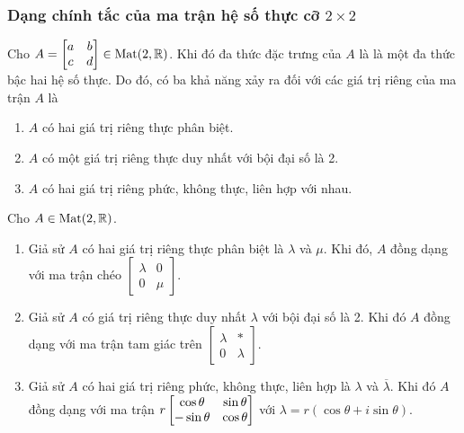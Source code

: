 \subsubsection{Dạng chính tắc của ma trận hệ số thực cỡ $2\times 2$}

Cho $A = \begin{bmatrix} a & b \\ c & d \\ \end{bmatrix} \in \operatorname{Mat}(2,\mathbb{R})$. Khi đó đa thức đặc trưng của $A$ là 
là một đa thức bậc hai hệ số thực. Do đó, có ba khả năng xảy ra đối với các giá trị riêng của ma trận $A$ là
\begin{enumerate}
    \item $A$ có hai giá trị riêng thực phân biệt.
    \item $A$ có một giá trị riêng thực duy nhất với bội đại số là 2.
    \item $A$ có hai giá trị riêng phức, không thực, liên hợp với nhau.
\end{enumerate}
\begin{prop}\label{prop 3.1.6}
Cho $A \in \operatorname{Mat}(2,\mathbb{R})$.
\begin{enumerate}
    \item Giả sử $A$ có hai giá trị riêng thực phân biệt là $\lambda$ và $\mu$.
    Khi đó, $A$ đồng dạng với ma trận chéo $\begin{bmatrix}
        \lambda & 0\\
        0 & \mu
    \end{bmatrix}$.
    \item Giả sử $A$ có giá trị riêng thực duy nhất $\lambda$ với bội đại số là 2.
    Khi đó $A$ đồng dạng với ma trận tam giác trên $\begin{bmatrix}
        \lambda & *\\
        0 & \lambda
    \end{bmatrix}$.
    \item Giả sử $A$ có hai giá trị riêng phức, không thực, liên hợp là $\lambda$ và $\overline{\lambda}$.
    Khi đó $A$ đồng dạng với ma trận $r\begin{bmatrix} \cos{\theta} & \sin{\theta}\\ -\sin{\theta} & \cos{\theta} \end{bmatrix}$ với $\lambda = r(\cos{\theta} + i \sin{\theta})$.
\end{enumerate}
\end{prop}

